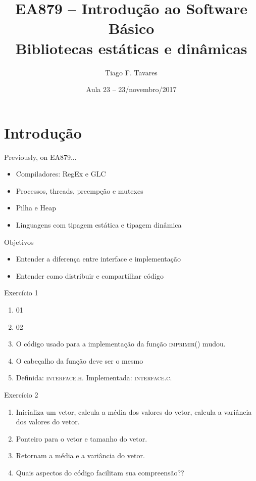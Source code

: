 \documentclass{beamer}
\title[23-Linking]{EA879 -- Introdução ao Software
Básico\\Bibliotecas estáticas e dinâmicas}
\author{Tiago F. Tavares}
\institute{FEEC -- UNICAMP}
\date{Aula 23 -- 23/novembro/2017}
\begin{document}
\begin{frame}
  \titlepage
\end{frame}


\section{Introdução}

\begin{frame}[fragile]{Previously, on EA879...}
  \centering
  \Large
  \begin{itemize}
    \item Compiladores: RegEx e GLC
    \item Processos, threads, preempção e mutexes
    \item Pilha e Heap
    \item Linguagens com tipagem estática e tipagem dinâmica
  \end{itemize}
\end{frame}

\begin{frame}{Objetivos}
  \Large
  \begin{itemize}
    \item Entender a diferença entre interface e implementação
    \item Entender como distribuir e compartilhar código
  \end{itemize}
\end{frame}



\begin{frame}[fragile]{Exercício 1}
  \centering
  \Large
  \begin{enumerate}
    \item <2-> 01
    \item <3-> 02
    \item <4->O código usado para a implementação da função \textsc{imprimir()}
      mudou.
    \item <5-> O cabeçalho da função deve ser o mesmo
    \item <6-> Definida: \textsc{interface.h}. Implementada:
      \textsc{interface.c}.
  \end{enumerate}
\end{frame}

\begin{frame}[fragile]{Exercício 2}
  \centering
  \Large
  \begin{enumerate}
    \item <2-> Inicializa um vetor, calcula a média dos valores do vetor,
      calcula a variância dos valores do vetor.
    \item <3-> Ponteiro para o vetor e tamanho do vetor.
    \item <4-> Retornam a média e a variância do vetor.
    \item <5-> Quais aspectos do código facilitam sua compreensão??
  \end{enumerate}
\end{frame}
\end{document}
